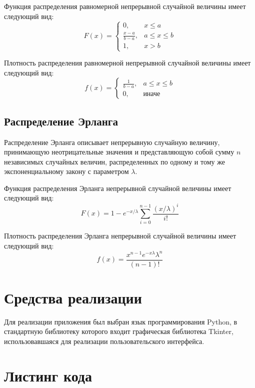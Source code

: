 \documentclass[12pt]{report}
\begin{document}
Функция распределения равномерной непрерывной случайной величины имеет следующий вид:
\begin{equation*}
	F(x) = \begin{cases}
		0, & x \leq a \\
		\frac{x-a}{b-a}, & a \leq x \leq b \\
		1, & x > b
	\end{cases}
\end{equation*}

Плотность распределения равномерной непрерывной случайной величины имеет следующий вид:
\begin{equation*}
	f(x) = \begin{cases}
		\frac{1}{b-a}, & a \leq x \leq b \\
		0, & \text{иначе}
	\end{cases}
\end{equation*}


\subsection*{Распределение Эрланга}
Распределение Эрланга описывает непрерывную случайную величину, принимающую неотрицательные значения и представляющую собой сумму $n$ независимых случайных величин, распределенных по одному и тому же экспоненциальному закону с параметром $\lambda$.
\newline

Функция распределения Эрланга непрерывной случайной величины имеет следующий вид:
\begin{equation*}
	F(x) = 1 - e^{-x/\lambda} \sum_{i=0}^{n-1} \frac{(x/\lambda)^i}{i!} 
\end{equation*}

Плотность распределения Эрланга непрерывной случайной величины имеет следующий вид:
\begin{equation*}
	f(x) = \frac{x^{n-1}e^{-x\lambda}\lambda^n}{(n-1)!}
\end{equation*}


\section*{Средства реализации}

Для реализации приложения был выбран язык программирования Python, в стандартную библиотеку которого входит графическая библиотека Tkinter, использовавшаяся для реализации пользовательского интерфейса.

\section*{Листинг кода}
\end{document}
